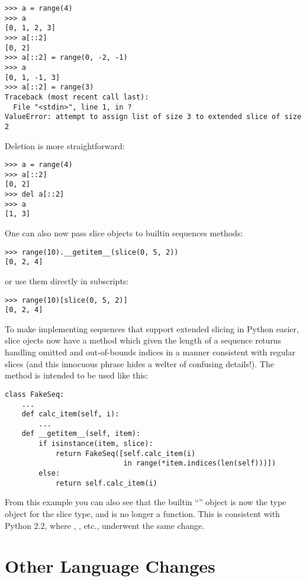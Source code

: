 \documentclass{howto}
\begin{document}
\begin{verbatim}
>>> a = range(4)
>>> a
[0, 1, 2, 3]
>>> a[::2]
[0, 2]
>>> a[::2] = range(0, -2, -1)
>>> a
[0, 1, -1, 3]
>>> a[::2] = range(3)
Traceback (most recent call last):
  File "<stdin>", line 1, in ?
ValueError: attempt to assign list of size 3 to extended slice of size 2
\end{verbatim}

Deletion is more straightforward:

\begin{verbatim}
>>> a = range(4)
>>> a[::2]
[0, 2]
>>> del a[::2]
>>> a
[1, 3]
\end{verbatim}

One can also now pass slice objects to builtin sequences
 methods:

\begin{verbatim}
>>> range(10).__getitem__(slice(0, 5, 2))
[0, 2, 4]
\end{verbatim}

or use them directly in subscripts:

\begin{verbatim}
>>> range(10)[slice(0, 5, 2)]
[0, 2, 4]
\end{verbatim}

To make implementing sequences that support extended slicing in Python
easier, slice ojects now have a method  which given
the length of a sequence returns  handling
omitted and out-of-bounds indices in a manner consistent with regular
slices (and this innocuous phrase hides a welter of confusing
details!).  The method is intended to be used like this:

\begin{verbatim}
class FakeSeq:
    ...
    def calc_item(self, i):
        ...
    def __getitem__(self, item):
        if isinstance(item, slice):
            return FakeSeq([self.calc_item(i)
                            in range(*item.indices(len(self)))])
        else:
            return self.calc_item(i)
\end{verbatim}

From this example you can also see that the builtin ``''
object is now the type object for the slice type, and is no longer a
function.  This is consistent with Python 2.2, where ,
, etc., underwent the same change.


\section{Other Language Changes}
\end{document}
